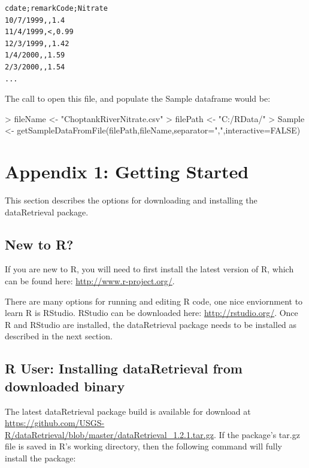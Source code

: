 \documentclass[a4paper,11pt]{article}
\begin{document}
\begin{verbatim}
cdate;remarkCode;Nitrate
10/7/1999,,1.4
11/4/1999,<,0.99
12/3/1999,,1.42
1/4/2000,,1.59
2/3/2000,,1.54
...
\end{verbatim}
The call to open this file, and populate the Sample dataframe would be:
\begin{Schunk}
\begin{Sinput}
> fileName <- "ChoptankRiverNitrate.csv"
> filePath <-  "C:/RData/"
> Sample <- getSampleDataFromFile(filePath,fileName,separator=",",interactive=FALSE)
\end{Sinput}
\end{Schunk}


\newpage
\section{Appendix 1: Getting Started}
This section describes the options for downloading and installing the dataRetrieval package.

\subsection{New to R?}
If you are new to R, you will need to first install the latest version of R, which can be found here: \url{http://www.r-project.org/}.

There are many options for running and editing R code, one nice enviornment to learn R is RStudio. RStudio can be downloaded here: \url{http://rstudio.org/}. Once R and RStudio are installed, the dataRetrieval package needs to be installed as described in the next section.

\subsection{R User: Installing dataRetrieval from downloaded binary}
The latest dataRetrieval package build is available for download at \url{https://github.com/USGS-R/dataRetrieval/blob/master/dataRetrieval_1.2.1.tar.gz}.  If the package's tar.gz file is saved in R's working directory, then the following command will fully install the package:
\end{document}
